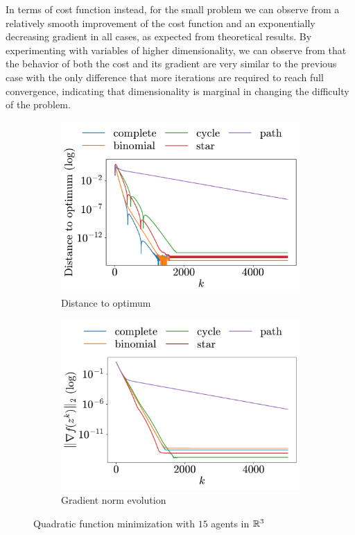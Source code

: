 \documentclass[a4paper,11pt,oneside]{book}
\begin{document}
In terms of cost function instead, for the small problem we can observe from  a relatively smooth improvement of the cost function and an exponentially decreasing gradient in all cases, as expected from theoretical results. By experimenting with variables of higher dimensionality, we can observe from  that the behavior of both the cost and its gradient are very similar to the previous case with the only difference that more iterations are required to reach full convergence, indicating that dimensionality is marginal in changing the difficulty of the problem. 


\begin{figure}[t!]
      \centering
      \begin{subfigure}[h]{0.42\linewidth}
            \centering
            \includegraphics[width=\linewidth]{./figs/quadratic/15_3/distance.pdf} 
            \caption{Distance to optimum}
      \end{subfigure}
      \hfill
      \begin{subfigure}[h]{0.42\linewidth}
            \centering
            \includegraphics[width=\linewidth]{./figs/quadratic/15_3/gradient.pdf} 
            \caption{Gradient norm evolution}
      \end{subfigure}
      \caption{Quadratic function minimization with $15$ agents in ${\mathbb{R}}^{3}$}
      \label{fig:quadratic_15_3}
\end{figure}
\end{document}
